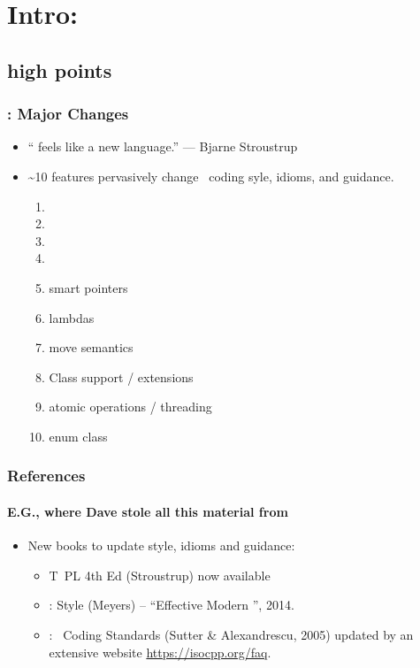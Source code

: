 \section{Intro: }

\lyxframeend{}\subsection[\CC 11]{{} high points}


\begin{frame}[fragile,t]
\frametitle{ : Major Changes}

\begin{itemize}

  \item \textquotedblleft{} feels like a new language.\textquotedblright{} --- Bjarne Stroustrup
    \pause{}

  \item \textasciitilde{}10 features pervasively change \CC\ coding
    syle, idioms, and guidance.
    \pause{}
    {\scriptsize
    \begin{enumerate}
    \item {}
    \item {}
    \item {}
    \item {}
    \item smart pointers
    \item lambdas
    \item move semantics
    \item Class support / extensions
    \item atomic operations / threading
    \item enum class
    \end{enumerate}
}
\end{itemize}

\end{frame}

\lyxframeend{}


\begin{frame}[fragile]
\frametitle{ References}
\framesubtitle{E.G., where Dave stole all this material from}
\begin{itemize}
  \item New books to update style, idioms and guidance:
    \begin{itemize}
    \item {} T\CC~PL 4th Ed (Stroustrup) now available

    \item {}: Style (Meyers) -- ``Effective Modern
      \CC'',  2014.

    \item {}: \CC\ Coding Standards (Sutter \&
    Alexandrescu, 2005) updated by an extensive website \url{https://isocpp.org/faq}.

    \end{itemize}
\end{itemize}
\end{frame}




